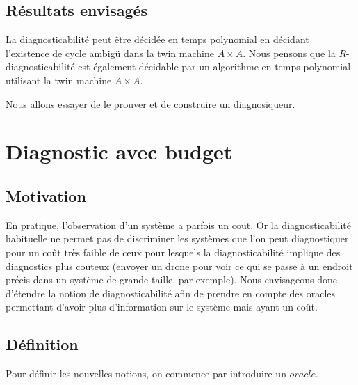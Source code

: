 \documentclass[a4paper,10pt]{article}
\begin{document}
\subsection{R\'esultats envisag\'es}

La diagnosticabilit\'e peut \^etre d\'ecid\'ee en temps polynomial en d\'ecidant l'existence de cycle ambig\"u dans la twin machine $A\times A$. Nous pensons que la $R$-diagnosticabilit\'e est \'egalement d\'ecidable par un algorithme en temps polynomial utilisant la twin machine $A\times A$.

Nous allons essayer de le prouver et de construire un diagnosiqueur.





\section{Diagnostic avec budget}
\subsection{Motivation}

En pratique, l'observation d'un système a parfois un cout. Or la diagnosticabilité habituelle ne permet pas de discriminer les systèmes que l'on peut diagnostiquer pour un coût très faible de ceux pour lesquels la diagnosticabilité implique des diagnostics plus couteux (envoyer un drone pour voir ce qui se passe à un endroit précis dans un système de grande taille, par exemple). Nous envisageons donc d'étendre la notion de diagnosticabilit\'e afin de prendre en compte des oracles permettant d'avoir plus d'information sur le système mais ayant un coût.


\subsection{D\'efinition}

Pour d\'efinir les nouvelles notions, on commence par introduire un $oracle$.
\end{document}
